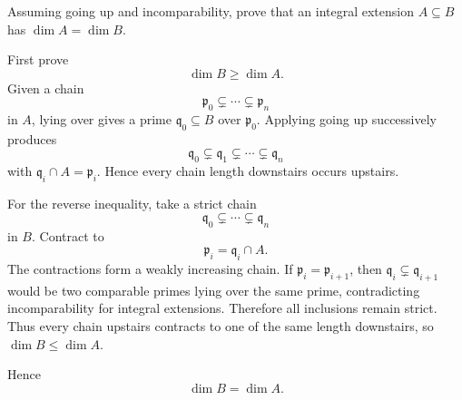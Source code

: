 \begin{problem}\label{prob:vi29-15}
Assuming going up and incomparability, prove that an integral extension \(A\subseteq B\) has \(\dim A=\dim B\).

\end{problem}

\ifdefined\FullProblemDossiers
\begin{solution}
First prove
\[
\dim B\ge\dim A.
\]
Given a chain
\[
\mathfrak p_0\subsetneq\cdots\subsetneq\mathfrak p_n
\]
in \(A\), lying over gives a prime \(\mathfrak q_0\subseteq B\) over \(\mathfrak p_0\).  Applying going up
successively produces
\[
\mathfrak q_0\subsetneq\mathfrak q_1\subsetneq\cdots\subsetneq\mathfrak q_n
\]
with \(\mathfrak q_i\cap A=\mathfrak p_i\).  Hence every chain length downstairs occurs upstairs.

For the reverse inequality, take a strict chain
\[
\mathfrak q_0\subsetneq\cdots\subsetneq\mathfrak q_n
\]
in \(B\).  Contract to
\[
\mathfrak p_i=\mathfrak q_i\cap A.
\]
The contractions form a weakly increasing chain.  If \(\mathfrak p_i=\mathfrak p_{i+1}\), then
\(\mathfrak q_i\subsetneq\mathfrak q_{i+1}\) would be two comparable primes lying over the same prime, contradicting
incomparability for integral extensions.  Therefore all inclusions remain strict.  Thus every chain upstairs
contracts to one of the same length downstairs, so \(\dim B\le\dim A\).

Hence
\[
\boxed{\dim B=\dim A}.
\]
\end{solution}
\fi
